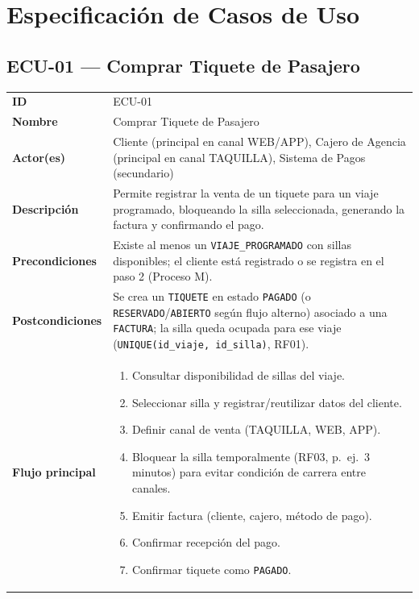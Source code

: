 \documentclass[11pt,a4paper]{article}
\begin{document}
\clearpage
\section{Especificación de Casos de Uso}

\subsection{ECU-01 --- Comprar Tiquete de Pasajero}

{
\begin{longtable}{L{3.2cm} L{11.3cm}}
\toprule
\textbf{ID} & ECU-01 \\
\textbf{Nombre} & Comprar Tiquete de Pasajero \\
\textbf{Actor(es)} & Cliente (principal en canal WEB/APP), Cajero de Agencia (principal en canal TAQUILLA), Sistema de Pagos (secundario) \\
\textbf{Descripción} & Permite registrar la venta de un tiquete para un viaje programado, bloqueando la silla seleccionada, generando la factura y confirmando el pago. \\
\textbf{Precondiciones} & Existe al menos un \texttt{VIAJE_PROGRAMADO} con sillas disponibles; el cliente está registrado o se registra en el paso 2 (Proceso M). \\
\textbf{Postcondiciones} & Se crea un \texttt{TIQUETE} en estado \texttt{PAGADO} (o \texttt{RESERVADO}/\texttt{ABIERTO} según flujo alterno) asociado a una \texttt{FACTURA}; la silla queda ocupada para ese viaje (\texttt{UNIQUE(id_viaje, id_silla)}, RF01). \\
\textbf{Flujo principal} &
\begin{enumerate}[nosep,leftmargin=*]
  \item Consultar disponibilidad de sillas del viaje.
  \item Seleccionar silla y registrar/reutilizar datos del cliente.
  \item Definir canal de venta (TAQUILLA, WEB, APP).
  \item Bloquear la silla temporalmente (RF03, p.\ ej.\ 3 minutos) para evitar condición de carrera entre canales.
  \item Emitir factura (cliente, cajero, método de pago).
  \item Confirmar recepción del pago.
  \item Confirmar tiquete como \texttt{PAGADO}.

\end{enumerate}
\end{longtable}}
\end{document}

